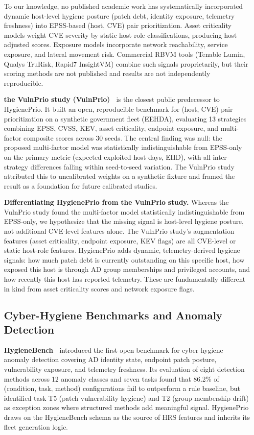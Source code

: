 To our knowledge, no published academic work has systematically incorporated dynamic host-level hygiene posture (patch debt, identity exposure, telemetry freshness) into EPSS-based (host, CVE) pair prioritization. Asset criticality models weight CVE severity by static host-role classifications, producing host-adjusted scores. Exposure models incorporate network reachability, service exposure, and lateral movement risk. Commercial RBVM tools (Tenable Lumin, Qualys TruRisk, Rapid7 InsightVM) combine such signals proprietarily, but their scoring methods are not published and results are not independently reproducible.

\textbf{the VulnPrio study (VulnPrio)~\cite{paper1vulnprio}} is the closest public predecessor to HygienePrio. It built an open, reproducible benchmark for (host, CVE) pair prioritization on a synthetic government fleet (EEHDA), evaluating 13 strategies combining EPSS, CVSS, KEV, asset criticality, endpoint exposure, and multi-factor composite scores across 30 seeds. The central finding was null: the proposed multi-factor model was statistically indistinguishable from EPSS-only on the primary metric (expected exploited host-days, EHD), with all inter-strategy differences falling within seed-to-seed variation. The VulnPrio study attributed this to uncalibrated weights on a synthetic fixture and framed the result as a foundation for future calibrated studies.

\textbf{Differentiating HygienePrio from the VulnPrio study.} Whereas the VulnPrio study found the multi-factor model statistically indistinguishable from EPSS-only, we hypothesize that the missing signal is host-level hygiene posture, not additional CVE-level features alone. The VulnPrio study's augmentation features (asset criticality, endpoint exposure, KEV flags) are all CVE-level or static host-role features. HygienePrio adds dynamic, telemetry-derived hygiene signals: how much patch debt is currently outstanding on this specific host, how exposed this host is through AD group memberships and privileged accounts, and how recently this host has reported telemetry. These are fundamentally different in kind from asset criticality scores and network exposure flags.

\subsection{Cyber-Hygiene Benchmarks and Anomaly Detection}

\textbf{HygieneBench~\cite{paper3hygienebench}} introduced the first open benchmark for cyber-hygiene anomaly detection covering AD identity state, endpoint patch posture, vulnerability exposure, and telemetry freshness. Its evaluation of eight detection methods across 12 anomaly classes and seven tasks found that 86.2\% of (condition, task, method) configurations fail to outperform a rule baseline, but identified task T5 (patch-vulnerability hygiene) and T2 (group-membership drift) as exception zones where structured methods add meaningful signal. HygienePrio draws on the HygieneBench schema as the source of HRS features and inherits its fleet generation logic.

